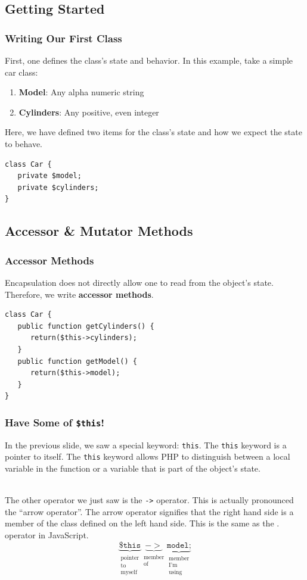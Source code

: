 \documentclass[aspectratio=169]{beamer}
\begin{document}
\subsection{Getting Started}
\begin{frame}[fragile]
\frametitle{Writing Our First Class}
First, one defines the class's state and behavior. In this example, take a simple car class:
\begin{enumerate}
	\item \textbf{Model}: Any alpha numeric string
	\item \textbf{Cylinders}: Any positive, even integer
\end{enumerate}

Here, we have defined two items for the class's state and how we expect the state to behave.
\begin{lstlisting}[caption=The Car's State]
class Car {
   private $model;
   private $cylinders;
}
\end{lstlisting}
\end{frame}

\subsection{Accessor \& Mutator Methods}
\begin{frame}[fragile]
\frametitle{Accessor Methods}
Encapsulation does not directly allow one to read from the object's state. Therefore, we write \textbf{accessor methods}.
\begin{lstlisting}[caption=The Car's Accessor Methods]
class Car {
   public function getCylinders() {
      return($this->cylinders);
   }
   public function getModel() {
      return($this->model);
   }
}
\end{lstlisting}
\end{frame}

\begin{frame}
\frametitle{Have Some of \texttt{\$this}!}
In the previous slide, we saw a special keyword: \texttt{this}. The \texttt{this} keyword is a pointer to itself. The \texttt{this} keyword allows PHP to distinguish between a local variable in the function or a variable that is part of the object's state.

\pause
\mbox{}\\
The other operator we just saw is the \texttt{->} operator. This is actually pronounced the ``arrow operator''. The arrow operator signifies that the right hand side is a member of the class defined on the left hand side. This is the same as the . operator in JavaScript.
\[\underbrace{\texttt{\$this}}_{\substack{\text{pointer}\\\text{to}\\\text{myself}}}\underbrace{->}_{\substack{\text{member}\\\text{of}}}\underbrace{\texttt{model;}}_{\substack{\text{member}\\\text{I'm}\\\text{using}}}\]
\end{frame}
\end{document}
